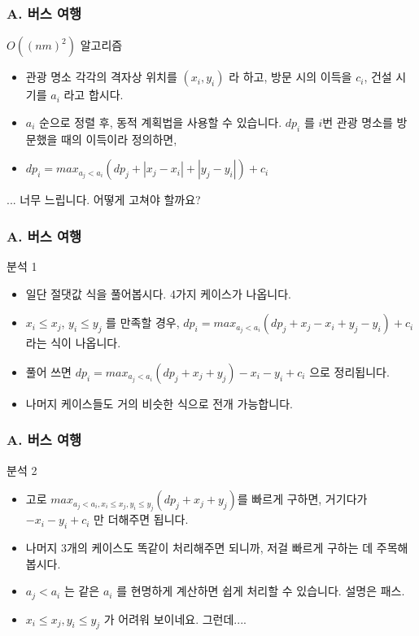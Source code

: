 \documentclass{beamer}
\begin{document}
\begin{frame}
	\frametitle{A. 버스 여행}
	\begin{block}{$O((nm)^2)$ 알고리즘}
		\begin{itemize}
			\item 관광 명소 각각의 격자상 위치를 $(x_i, y_i)$ 라 하고, 방문 시의 이득을 $c_i$, 건설 시기를 $a_i$ 라고 합시다.
			\item $a_i$ 순으로 정렬 후, 동적 계획법을 사용할 수 있습니다. $dp_i$ 를 $i$번 관광 명소를 방문했을 때의 이득이라 정의하면, 
			\item $dp_i = max_{a_j < a_i}(dp_j + |x_j - x_i| + |y_j - y_i|) + c_i$
		\end{itemize}
	\end{block}
	... 너무 느립니다. 어떻게 고쳐야 할까요?
\end{frame}
	
	
\begin{frame}
	\frametitle{A. 버스 여행}
		\begin{block}{분석 1}
		\begin{itemize}
			\item 일단 절댓값 식을 풀어봅시다. 4가지 케이스가 나옵니다. 
			\item $x_i \leq x_j$, $y_i \leq y_j$ 를 만족할 경우, $dp_i = max_{a_j < a_i}(dp_j + x_j - x_i + y_j - y_i) + c_i$ 라는 식이 나옵니다. 
			\item 풀어 쓰면 $dp_i = max_{a_j < a_i}(dp_j + x_j + y_j) - x_i - y_i + c_i$ 으로 정리됩니다.
			\item 나머지 케이스들도 거의 비슷한 식으로 전개 가능합니다. 
		\end{itemize}
	\end{block}
\end{frame}

\begin{frame}
\frametitle{A. 버스 여행}
		\begin{block}{분석 2}
\begin{itemize}
	\item 고로 $max_{a_j < a_i, x_i \leq x_j, y_i \leq y_j} (dp_j + x_j + y_j)$를 빠르게 구하면, 거기다가 $-x_i - y_i + c_i$ 만 더해주면 됩니다.
	\item 나머지 3개의 케이스도 똑같이 처리해주면 되니까, 저걸 빠르게 구하는 데 주목해 봅시다.
	\item $a_j < a_i$ 는 같은 $a_i$ 를 현명하게 계산하면 쉽게 처리할 수 있습니다. 설명은 패스.
	\item $x_i \leq x_j, y_i \leq y_j$ 가 어려워 보이네요. 그런데....
\end{itemize}
\end{block}
\end{frame}
\end{document}
